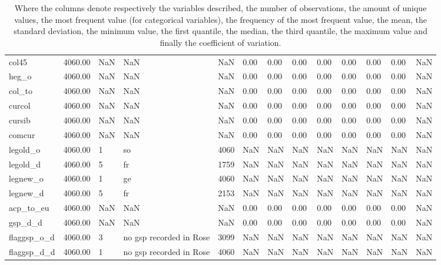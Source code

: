 \documentclass{Trade_template}
\numberwithin{equation}{section}
\begin{document}
\begin{table}
{\begin{tabularx}{\textwidth}{@{} L *{12}{Y}  @{}}
col45 & 4060.00 & NaN & NaN & NaN & 0.00 & 0.00 & 0.00 & 0.00 & 0.00 & 0.00 & 0.00 & NaN \\
heg\_o & 4060.00 & NaN & NaN & NaN & 0.00 & 0.00 & 0.00 & 0.00 & 0.00 & 0.00 & 0.00 & NaN \\
col\_to & 4060.00 & NaN & NaN & NaN & 0.00 & 0.00 & 0.00 & 0.00 & 0.00 & 0.00 & 0.00 & NaN \\
curcol & 4060.00 & NaN & NaN & NaN & 0.00 & 0.00 & 0.00 & 0.00 & 0.00 & 0.00 & 0.00 & NaN \\
cursib & 4060.00 & NaN & NaN & NaN & 0.00 & 0.00 & 0.00 & 0.00 & 0.00 & 0.00 & 0.00 & NaN \\
comcur & 4060.00 & NaN & NaN & NaN & 0.00 & 0.00 & 0.00 & 0.00 & 0.00 & 0.00 & 0.00 & NaN \\
legold\_o & 4060.00 & 1 & so & 4060 & NaN & NaN & NaN & NaN & NaN & NaN & NaN & NaN \\
legold\_d & 4060.00 & 5 & fr & 1759 & NaN & NaN & NaN & NaN & NaN & NaN & NaN & NaN \\
legnew\_o & 4060.00 & 1 & ge & 4060 & NaN & NaN & NaN & NaN & NaN & NaN & NaN & NaN \\
legnew\_d & 4060.00 & 5 & fr & 2153 & NaN & NaN & NaN & NaN & NaN & NaN & NaN & NaN \\
acp\_to\_eu & 4060.00 & NaN & NaN & NaN & 0.00 & 0.00 & 0.00 & 0.00 & 0.00 & 0.00 & 0.00 & NaN \\
gsp\_d\_d & 4060.00 & NaN & NaN & NaN & 0.00 & 0.00 & 0.00 & 0.00 & 0.00 & 0.00 & 0.00 & NaN \\
flaggsp\_o\_d & 4060.00 & 3 & no gsp recorded in Rose & 3099 & NaN & NaN & NaN & NaN & NaN & NaN & NaN & NaN \\
flaggsp\_d\_d & 4060.00 & 1 & no gsp recorded in Rose & 4060 & NaN & NaN & NaN & NaN & NaN & NaN & NaN & NaN \\ \bottomrule
\end{tabularx}}
\caption*{\tiny{Where the columns denote respectively the variables described, the number of observations, the amount of unique values, the most frequent value (for categorical variables), the frequency of the most frequent value, the mean, the standard deviation, the minimum value, the first quantile, the median, the third quantile, the maximum value and finally the coefficient of variation.}}
\end{table}

\newpage
\end{document}
